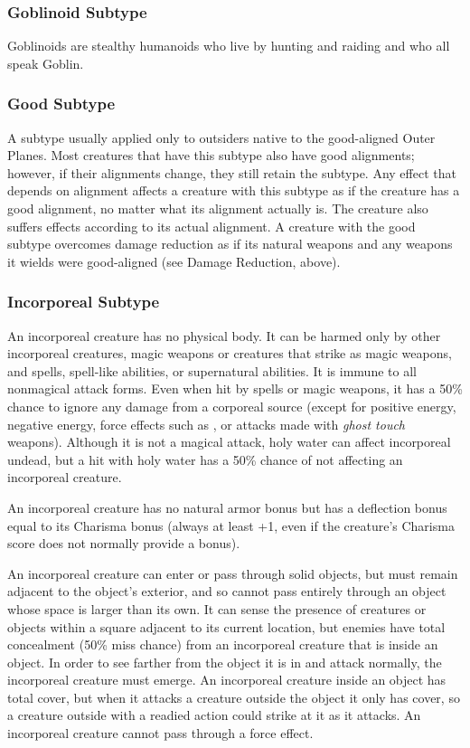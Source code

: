\subsubsection{Goblinoid Subtype}
Goblinoids are stealthy humanoids who live by hunting and raiding and who all speak Goblin.

\subsubsection{Good Subtype}
A subtype usually applied only to outsiders native to the good-aligned Outer Planes. Most creatures that have this subtype also have good alignments; however, if their alignments change, they still retain the subtype. Any effect that depends on alignment affects a creature with this subtype as if the creature has a good alignment, no matter what its alignment actually is. The creature also suffers effects according to its actual alignment. A creature with the good subtype overcomes damage reduction as if its natural weapons and any weapons it wields were good-aligned (see Damage Reduction, above).

\subsubsection{Incorporeal Subtype}
An incorporeal creature has no physical body. It can be harmed only by other incorporeal creatures, magic weapons or creatures that strike as magic weapons, and spells, spell-like abilities, or supernatural abilities. It is immune to all nonmagical attack forms. Even when hit by spells or magic weapons, it has a 50\% chance to ignore any damage from a corporeal source (except for positive energy, negative energy, force effects such as , or attacks made with \emph{ghost touch} weapons). Although it is not a magical attack, holy water can affect incorporeal undead, but a hit with holy water has a 50\% chance of not affecting an incorporeal creature.

An incorporeal creature has no natural armor bonus but has a deflection bonus equal to its Charisma bonus (always at least +1, even if the creature's Charisma score does not normally provide a bonus).

An incorporeal creature can enter or pass through solid objects, but must remain adjacent to the object's exterior, and so cannot pass entirely through an object whose space is larger than its own. It can sense the presence of creatures or objects within a square adjacent to its current location, but enemies have total concealment (50\% miss chance) from an incorporeal creature that is inside an object. In order to see farther from the object it is in and attack normally, the incorporeal creature must emerge. An incorporeal creature inside an object has total cover, but when it attacks a creature outside the object it only has cover, so a creature outside with a readied action could strike at it as it attacks. An incorporeal creature cannot pass through a force effect.

